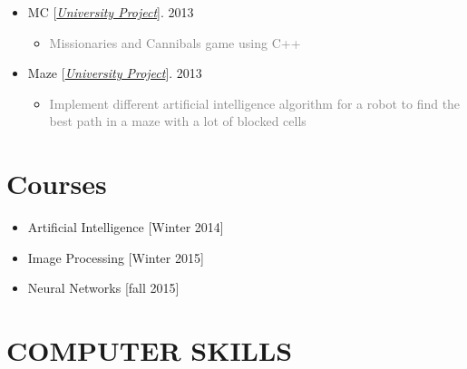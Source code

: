 \documentclass[10pt,a4paper,sans]{moderncv} %
\begin{document}
\begin{itemize}
		\item MC [\href{https://sbu.ac.ir/Cols/CSE/Pages/default.aspx/}{\emph{University Project}}]. \hfill 2013
		\begin{itemize}
			\item \textcolor{gray} {Missionaries and Cannibals game using C++}
		\end{itemize}

		\item Maze [\href{https://sbu.ac.ir/Cols/CSE/Pages/default.aspx/}{\emph{University Project}}]. \hfill 2013
		\begin{itemize}
			\item \textcolor{gray} {Implement different artificial intelligence algorithm for a robot to find the best path in a maze with a lot of blocked cells}
		\end{itemize}


	\end{itemize}


	\section{Courses}
	\begin{multicols}{2}
		\begin{itemize}
			\item {} Artificial Intelligence \hfill[Winter 2014]
			\item {} Image Processing \hfill[Winter 2015]
			\item {} Neural Networks \hfill[fall 2015]
			
		\end{itemize}
	\end{multicols}
	
		

	\section{COMPUTER SKILLS}
	
\end{document}
